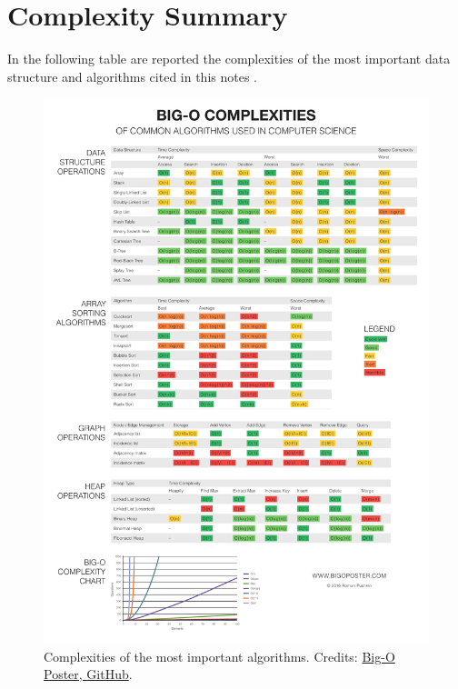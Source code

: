 \chapter{Complexity Summary}
\label{complexityappendix}

In the following table are reported the complexities of the most important data structure and algorithms cited in this notes \cite{bigoposter}.

\begin{figure}[H]
	\begin{center}
		\includegraphics[scale=0.31]{chapters/appendix/appcomplexity/images/bigoposter.pdf}
		\caption[Complexities of the most important algorithms.]{Complexities of the most important algorithms. Credits: \href{https://github.com/ro31337/bigoposter}{Big-O Poster, GitHub}.}
	\end{center}
\end{figure}
 